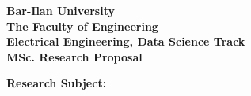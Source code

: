 \begin{titlepage}
   






    \begin{center}


        \vspace*{2\bigskipamount}


        {\makeatletter
            \titlestyle\bfseries\LARGE Bar-Ilan University \\
            The Faculty of Engineering \\
            \bigskip
            Electrical Engineering, Data Science Track \\
            \bigskip
            MSc. Research Proposal
            \makeatother}
        \bigskip
        \bigskip
        \bigskip

    \end{center} 
      \textbf{Research Subject:} 
     \begin{center}
         
        
        \bigskip
        {\makeatletter
            \titlestyle\bfseries\LARGE 
            \@title
            \makeatother}

        {\makeatletter
            \ifx\@subtitle\undefined\else
                \bigskip
                \titlefont\titleshape\Large\@subtitle
            \fi
            \makeatother}

        \vfill


\end{center}
\end{titlepage}
